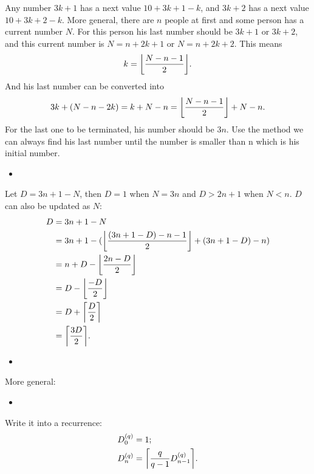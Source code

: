 \documentclass{article}
\DeclarePairedDelimiter\ceil{\lceil}{\rceil}
\DeclarePairedDelimiter\floor{\lfloor}{\rfloor}
\newcommand{\insertcode}[2]{\begin{itemize}\item[]\end{itemize}}
\begin{document}
Any number $3k+1$ has a next value $10 + 3k + 1 - k$, and $3k + 2$ has a next value $10 + 3k + 2 - k$.
More general, there are $n$ people at first and some person has a current number $N$.
For this person his last number should be $3k+1$ or $3k+2$, and this current number is $N = n + 2k+1$ or $N = n+2k+2$.
This means 
\begin{align}
k = \floor*{\frac{N - n - 1}{2}}.
\end{align}
And his last number can be converted into
\begin{align}
3k + (N - n - 2k) = k + N - n = \floor*{\frac{N - n - 1}{2}} + N - n.
\end{align}
For the last one to be terminated, his number should be $3n$.
Use the method we can always find his last number until the number is smaller than n which is his initial number.

\insertcode{"c3/a0.py"}{Method 0}

Let $D = 3n + 1 - N$, then $D = 1$ when $N = 3n$ and $D > 2n + 1$ when $N < n$.
$D$ can also be updated as $N$:
\begin{align}
D &= 3n + 1 - N  \\
  &= 3n + 1 - (\floor*{\frac{(3n + 1 - D) - n - 1}{2}} + (3n + 1 -D) - n)  \\
  &= n + D - \floor*{\frac{2n - D}{2}}  \\
  &= D - \floor*{\frac{-D}{2}} \\
  &= D + \ceil*{\frac{D}{2}} \\
  &= \ceil*{\frac{3D}{2}}.
\end{align}

\insertcode{"c3/a1.py"}{Method 1}

More general:

\insertcode{"c3/a2.py"}{Method 2}

Write it into a recurrence:
\begin{align}
D_0^{(q)} &= 1; \\
D_n^{(q)} &= \ceil*{\frac{q}{q-1} D_{n-1}^{(q)}}.
\end{align}
\end{document}
